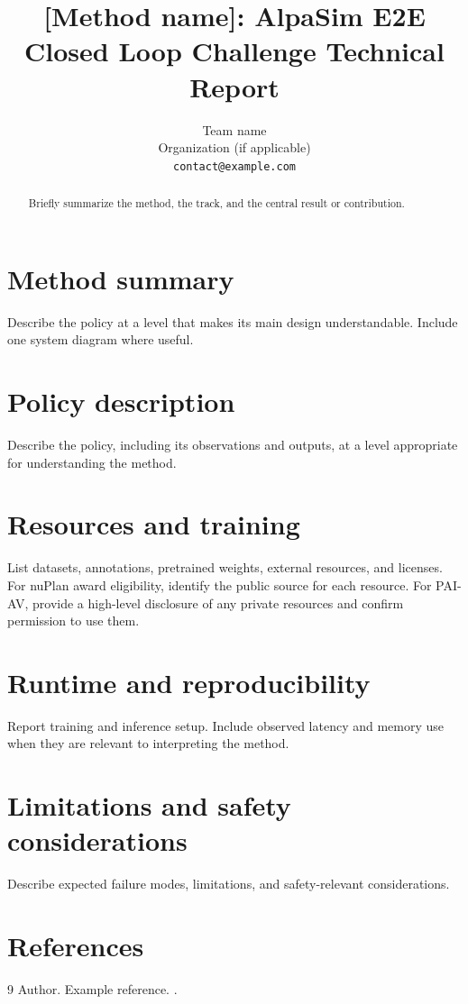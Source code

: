 \documentclass{article}
\title{[Method name]: AlpaSim E2E Closed Loop Challenge Technical Report}
\author{
  Team name \\
  Organization (if applicable) \\
  \texttt{contact@example.com}
}
\begin{document}
\maketitle

\begin{abstract}
Briefly summarize the method, the track, and the central result or contribution.
\end{abstract}

\section{Method summary}
Describe the policy at a level that makes its main design understandable. Include one
system diagram where useful.

\section{Policy description}
Describe the policy, including its observations and outputs, at a level appropriate
for understanding the method.

\section{Resources and training}
List datasets, annotations, pretrained weights, external resources, and licenses.
For nuPlan award eligibility, identify the public source for each resource. For PAI-AV,
provide a high-level disclosure of any private resources and confirm permission to use them.

\section{Runtime and reproducibility}
Report training and inference setup. Include observed latency and memory use when
they are relevant to interpreting the method.

\section{Limitations and safety considerations}
Describe expected failure modes, limitations, and safety-relevant considerations.

\section*{References}
\begin{thebibliography}{9}
 Author. \newblock Example reference. .
\end{thebibliography}

\end{document}
